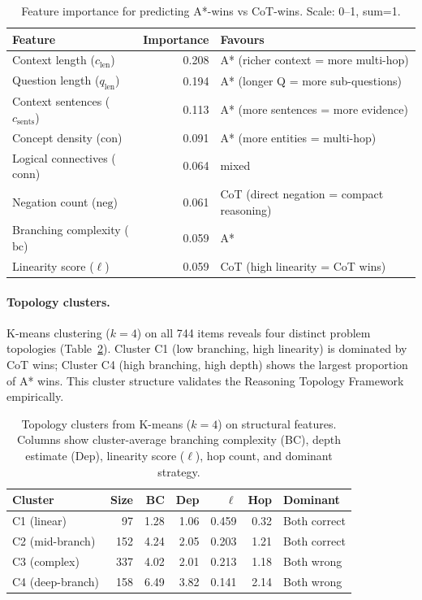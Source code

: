 \documentclass[11pt]{article}
\begin{document}
\begin{table}[t]
\centering
\caption{Feature importance for predicting A*-wins vs CoT-wins. Scale: 0--1, sum=1.}
\label{tab:feat_imp}
\small
\begin{tabular}{lrl}
\toprule
\textbf{Feature} & \textbf{Importance} & \textbf{Favours} \\
\midrule
Context length ($c_{\mathrm{len}}$)       & 0.208 & A* (richer context = more multi-hop) \\
Question length ($q_{\mathrm{len}}$)      & 0.194 & A* (longer Q = more sub-questions) \\
Context sentences ($c_{\mathrm{sents}}$)  & 0.113 & A* (more sentences = more evidence) \\
Concept density ($\mathrm{con}$)          & 0.091 & A* (more entities = multi-hop) \\
Logical connectives ($\mathrm{conn}$)     & 0.064 & mixed \\
Negation count ($\mathrm{neg}$)           & 0.061 & CoT (direct negation = compact reasoning) \\
Branching complexity ($\mathrm{bc}$)      & 0.059 & A* \\
Linearity score ($\ell$)                  & 0.059 & CoT (high linearity = CoT wins) \\
\bottomrule
\end{tabular}
\end{table}

\paragraph{Topology clusters.}
K-means clustering ($k=4$) on all 744 items reveals four distinct problem topologies (Table~\ref{tab:clusters}). Cluster C1 (low branching, high linearity) is dominated by CoT wins; Cluster C4 (high branching, high depth) shows the largest proportion of A* wins. This cluster structure validates the Reasoning Topology Framework empirically.

\begin{table}[t]
\centering
\caption{Topology clusters from K-means ($k=4$) on structural features. Columns show cluster-average branching complexity (BC), depth estimate (Dep), linearity score ($\ell$), hop count, and dominant strategy.}
\label{tab:clusters}
\small
\begin{tabular}{lrrrrrl}
\toprule
\textbf{Cluster} & \textbf{Size} & \textbf{BC} & \textbf{Dep} & \textbf{$\ell$} & \textbf{Hop} & \textbf{Dominant} \\
\midrule
C1 (linear)        &  97 & 1.28 & 1.06 & 0.459 & 0.32 & Both correct \\
C2 (mid-branch)    & 152 & 4.24 & 2.05 & 0.203 & 1.21 & Both correct \\
C3 (complex)       & 337 & 4.02 & 2.01 & 0.213 & 1.18 & Both wrong   \\
C4 (deep-branch)   & 158 & 6.49 & 3.82 & 0.141 & 2.14 & Both wrong   \\
\bottomrule
\end{tabular}
\end{table}
\end{document}
